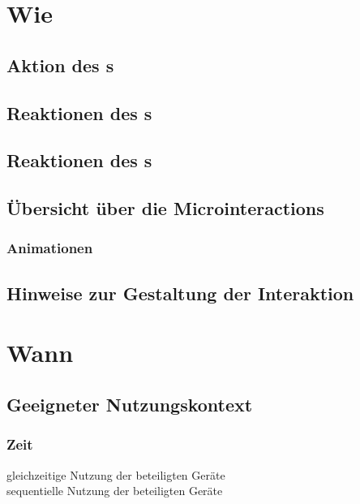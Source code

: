 \newpage
\section*{Wie}

\subsection*{Aktion des \sen s}
\useraction

\subsection*{Reaktionen des \sendev s}
\reactionSen

\subsection*{Reaktionen des \recdev s}
\reactionRec

\subsection*{Übersicht über die Microinteractions}
\microinteractionstabular

\subsubsection*{Animationen}
\animations

\subsection*{Hinweise zur Gestaltung der Interaktion}
\designnotes


\section*{Wann}

\subsection*{Geeigneter Nutzungskontext}
\validcontext

\subsubsection*{Zeit}
\checkbox{\simultaneously} gleichzeitige Nutzung der beteiligten Geräte \\
\checkbox{\sequentially} sequentielle Nutzung der beteiligten Geräte

